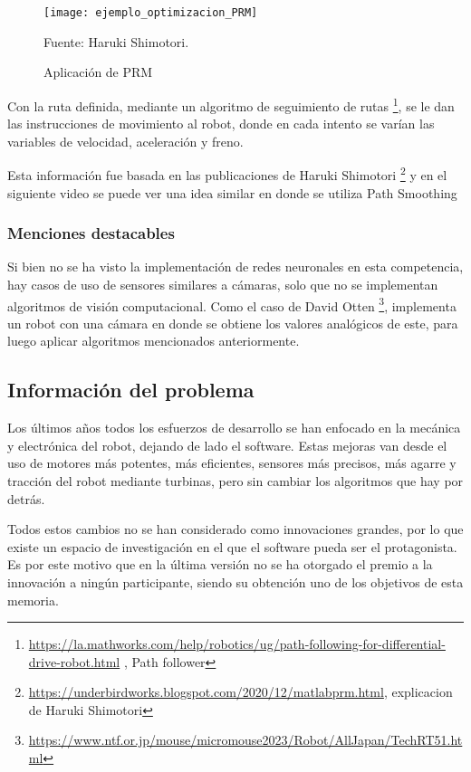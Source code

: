 \begin{figure}[h]
\centering
\texttt{[image: ejemplo\_optimizacion\_PRM]}
\caption{\label{fig:PRM} Aplicación de PRM} Fuente: Haruki Shimotori.
\end{figure}

Con la ruta definida, mediante un algoritmo de seguimiento de rutas \footnote{\url{https://la.mathworks.com/help/robotics/ug/path-following-for-differential-drive-robot.html} , Path follower}, se le dan las instrucciones de movimiento al robot, donde en cada intento se varían las variables de velocidad, aceleración y freno.

Esta información fue basada en las publicaciones de Haruki Shimotori \footnote{\url{https://underbirdworks.blogspot.com/2020/12/matlabprm.html}, explicacion de Haruki Shimotori } y en el siguiente video se puede ver una idea similar en donde se utiliza Path Smoothing \cite{pathsmoothing}

\subsubsection{Menciones destacables}

Si bien no se ha visto la implementación de redes neuronales en esta competencia, hay casos de uso de sensores similares a cámaras, solo que no se implementan algoritmos de visión computacional. Como el caso de David Otten \footnote{\url{https://www.ntf.or.jp/mouse/micromouse2023/Robot/AllJapan/TechRT51.html}}, implementa un robot con una cámara en donde se obtiene los valores analógicos de este, para luego aplicar algoritmos mencionados anteriormente.

\subsection{Información del problema}
Los últimos años todos los esfuerzos de desarrollo se han enfocado en la mecánica y electrónica del robot, dejando de lado el software. Estas mejoras van desde el uso de motores más potentes, más eficientes, sensores más precisos, más agarre y tracción del robot mediante turbinas, pero sin cambiar los algoritmos que hay por detrás.

Todos estos cambios no se han considerado como innovaciones grandes, por lo que existe un espacio de investigación en el que el software pueda ser el protagonista. Es por este motivo que en la última versión no se ha otorgado el premio a la innovación a ningún participante, siendo su obtención uno de los objetivos de esta memoria.


